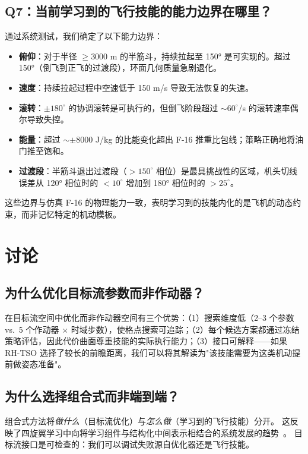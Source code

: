 \documentclass{article}
\begin{document}
\subsection{Q7：当前学习到的飞行技能的能力边界在哪里？}

通过系统测试，我们确定了以下能力边界：
\begin{itemize}
  \item \textbf{俯仰}：对于半径 $\geq 3000$ m 的半筋斗，持续拉起至 150° 是可实现的。超过 150°（倒飞到正飞的过渡段），环面几何质量急剧退化。
  \item \textbf{速度}：持续拉起过程中空速低于 150 m/s 导致无法恢复的失速。
  \item \textbf{滚转}：$\pm180^\circ$ 的协调滚转是可执行的，但倒飞阶段超过 $\sim60^\circ$/s 的滚转速率偶尔导致失控。
  \item \textbf{能量}：超过 $\sim\pm8000$ J/kg 的比能变化超出 F-16 推重比包线；策略正确地将油门推至饱和。
  \item \textbf{过渡段}：半筋斗退出过渡段（$>150^\circ$ 相位）是最具挑战性的区域，机头切线误差从 120° 相位时的 $<10^\circ$ 增加到 180° 相位时的 $>25^\circ$。
\end{itemize}

这些边界与仿真 F-16 的物理能力一致，表明学习到的技能内化的是飞机的动态约束，而非记忆特定的机动模板。


\section{讨论}

\subsection{为什么优化目标流参数而非作动器？}

在目标流空间中优化而非作动器空间有三个优势：（1）搜索维度低（2--3 个参数 vs.\ 5 个作动器 $\times$ 时域步数），使格点搜索可追踪；（2）每个候选方案都通过冻结策略评估，因此代价曲面尊重技能的实际执行能力；（3）接口可解释——如果 RH-TSO 选择了较长的前瞻距离，我们可以将其解读为"该技能需要为这类机动提前做姿态准备"。

\subsection{为什么选择组合式而非端到端？}

组合式方法将\emph{做什么}（目标流优化）与\emph{怎么做}（学习到的飞行技能）分开。
这反映了四旋翼学习中向将学习组件与结构化中间表示相结合的系统发展的趋势~\citep{kaufmann2023deep,kaufmann2019combining}。
目标流接口是可检查的：我们可以调试失败源自优化器还是飞行技能。
\end{document}
